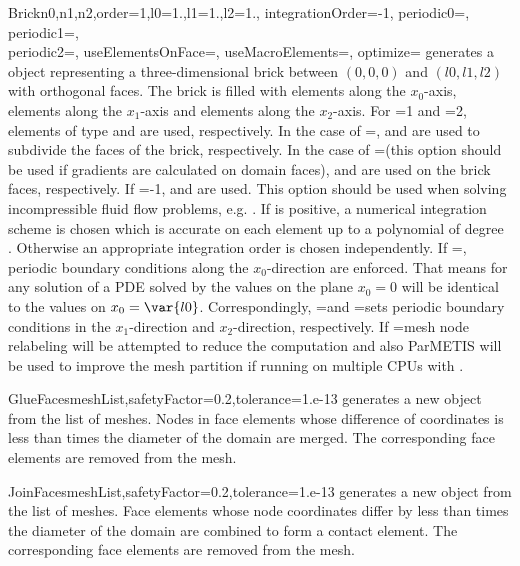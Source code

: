 \begin{funcdesc}{Brick}{n0,n1,n2,order=1,l0=1.,l1=1.,l2=1., integrationOrder=-1,
  periodic0=\False, periodic1=\False, \\ periodic2=\False, useElementsOnFace=\False, useMacroElements=\False, optimize=\False}
generates a \Domain object representing a three-dimensional brick between
$(0,0,0)$ and $(l0,l1,l2)$ with orthogonal faces. The brick is filled with
 elements along the $x_0$-axis,
 elements along the $x_1$-axis and
 elements along the $x_2$-axis.
For =1 and =2, elements of type  and
 are used, respectively.
In the case of =\False,  and
 are used to subdivide the faces of the brick, respectively.
In the case of =\True (this option should be used if
gradients are calculated on domain faces),  and
 are used on the brick faces, respectively.
If =-1,  and 
are used. This option should be used when solving incompressible fluid flow
problems, e.g. .
If  is positive, a numerical integration scheme is chosen
which is accurate on each element up to a polynomial of degree
.
Otherwise an appropriate integration order is chosen independently.
If =\True, periodic boundary conditions
along the $x_0$-direction are enforced.
That means for any solution of a PDE solved by \finley the values on the plane
$x_0=0$ will be identical to the values on $x_0=\var{l0}$.
Correspondingly, =\True and =\True sets periodic
boundary conditions in the $x_1$-direction and $x_2$-direction, respectively.
If =\True mesh node relabeling will be attempted to reduce the
computation and also ParMETIS will be used to improve the mesh partition if
running on multiple CPUs with \MPI.
\end{funcdesc}

\begin{funcdesc}{GlueFaces}{meshList,safetyFactor=0.2,tolerance=1.e-13}
generates a new \Domain object from the list  of \finley meshes.
Nodes in face elements whose difference of coordinates is less than
 times the diameter of the domain are merged.
The corresponding face elements are removed from the mesh.
\end{funcdesc}

\begin{funcdesc}{JoinFaces}{meshList,safetyFactor=0.2,tolerance=1.e-13}
generates a new \Domain object from the list  of \finley meshes.
Face elements whose node coordinates differ by less than  times
the diameter of the domain are combined to form a contact element.
The corresponding face elements are removed from the mesh.
\end{funcdesc}

